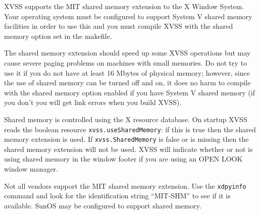 \eject
{}

   XVSS supports the MIT shared memory extension to the X Window
System.  Your operating system must be configured to support System V
shared memory facilities in order to use this and you must compile
XVSS with the shared memory option set in the makefile.

   The shared memory extension should speed up some XVSS operations
but may cause severe paging problems on machines with small memories.
Do not try to use it if you do not have at least 16 Mbytes of physical
memory;  however, since the use of shared memory can be turned off and
on, it does no harm to compile with the shared memory option enabled
if you have System V shared memory (if you don't you will get link
errors when you build \hbox{XVSS}).

    Shared memory is controlled using the X resource database.  On
startup XVSS reads the boolean resource {\tt xvss.useSharedMemory}:
if this is true then the shared memory extension is used.  If
{\tt xvss.SharedMemory} is false or is missing then the shared memory
extension will not be used.  XVSS will indicate whether or not is
using shared memory in the window footer if you are using an OPEN LOOK
window manager.

    Not all vendors support the MIT shared memory extension.  Use the
{\tt xdpyinfo} command and look for the identification string
``MIT-SHM'' to see if it is available.  SunOS may be configured to
support shared memory.

\vfill\eject

\bye
